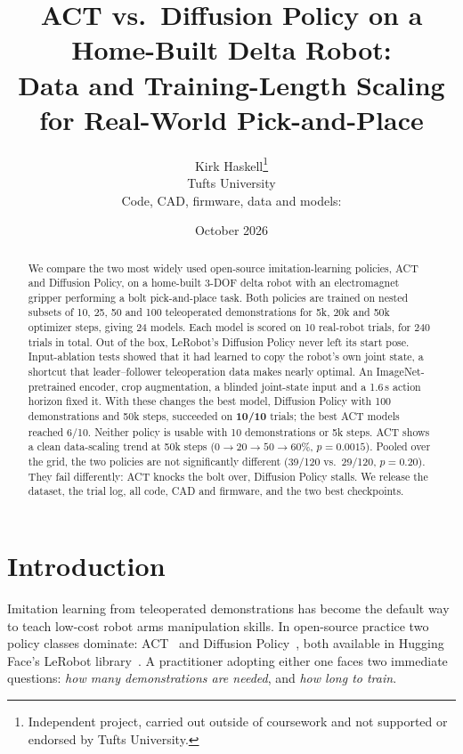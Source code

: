 \documentclass[10pt,twocolumn,letterpaper]{article}
\title{\Large\bfseries ACT vs.\ Diffusion Policy on a Home-Built Delta Robot:\\
Data and Training-Length Scaling for Real-World Pick-and-Place}
\author{Kirk Haskell\thanks{Independent project, carried out outside of coursework and not
supported or endorsed by Tufts University.}\\[1pt]
\small Tufts University\\[2pt]
\small Code, CAD, firmware, data and models: \repo}
\date{October 2026}
\newcommand{\best}[1]{\textbf{#1}}
\begin{document}
\maketitle

\begin{abstract}
We compare the two most widely used open-source imitation-learning policies, ACT and Diffusion
Policy, on a home-built 3-DOF delta robot with an electromagnet gripper performing a bolt
pick-and-place task. Both policies are trained on nested subsets of 10, 25, 50 and 100
teleoperated demonstrations for 5k, 20k and 50k optimizer steps, giving 24 models. Each model is
scored on 10 real-robot trials, for 240 trials in total. Out of the box, LeRobot's Diffusion
Policy never left its start pose. Input-ablation tests showed that it had learned to copy the
robot's own joint state, a shortcut that leader--follower teleoperation data makes nearly
optimal. An ImageNet-pretrained encoder, crop augmentation, a blinded joint-state input and a
1.6\,s action horizon fixed it. With these changes the best model, Diffusion Policy with 100
demonstrations and 50k steps, succeeded on \best{10/10} trials; the best ACT models reached 6/10.
Neither policy is usable with 10 demonstrations or 5k steps. ACT shows a clean data-scaling
trend at 50k steps ($0\rightarrow 20\rightarrow 50\rightarrow 60\%$, $p=0.0015$). Pooled over the
grid, the two policies are not significantly different (39/120 vs.\ 29/120, $p=0.20$). They fail
differently: ACT knocks the bolt over, Diffusion Policy stalls. We release the dataset, the trial
log, all code, CAD and firmware, and the two best checkpoints.
\end{abstract}

\section{Introduction}

Imitation learning from teleoperated demonstrations has become the default way to teach low-cost
robot arms manipulation skills. In open-source practice two policy classes dominate:
ACT~\cite{zhao2023act} and Diffusion Policy~\cite{chi2023diffusion}, both available in Hugging
Face's LeRobot library~\cite{cadene2024lerobot}. A practitioner adopting either one faces two
immediate questions: \emph{how many demonstrations are needed}, and \emph{how long to train}.
\end{document}
